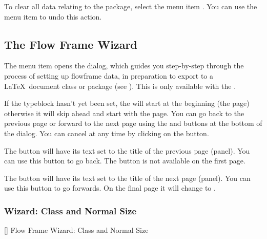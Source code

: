 To clear all data relating to the  package,
select the menu item .
You can use the  menu item to undo this action.


\subsection{The Flow Frame Wizard}\label{sec:flfwizard}


The  menu item opens the  dialog,
which guides you step-by-step through the process of setting up 
\gls{flowframe} data, in preparation to export to a \LaTeX\ document
class or package (see ). This is only
available with the .


If the \gls{typeblock} hasn't yet been set, the  will
start at the beginning (the  page) otherwise
it will skip ahead and start with the 
page. You can go back to the previous page or forward to the next
page using the  and
 buttons at the bottom of the
 dialog. You can cancel at any time by clicking on
the  button.

The  button will have its text set to the
title of the previous page (panel). You can use this button to go back. The
button is not available on the first page.

The  button will have its text set to the
title of the next page (panel). You can use this button to go forwards. On
the final page it will change to .

\subsubsection{Wizard: Class and Normal Size}\label{sec:flfwizardclass}


[]
{}
{Flow Frame Wizard: Class and Normal Size}

